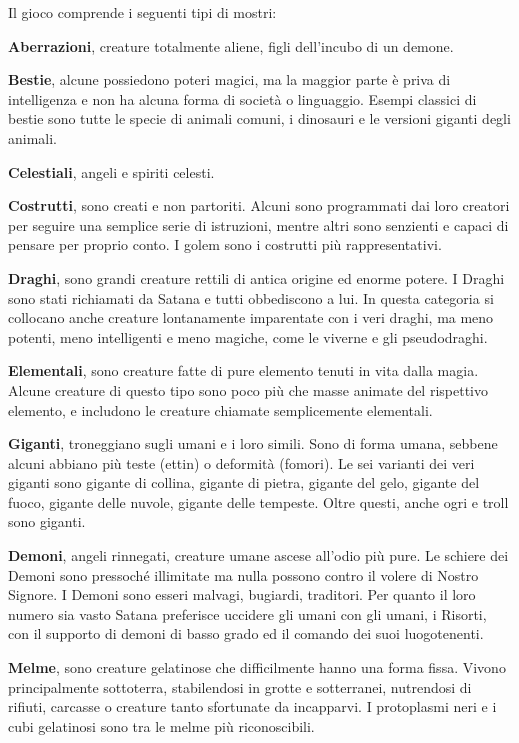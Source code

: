 \documentclass[a4paper,twoside,openany]{book}
\begin{document}
Il gioco comprende i seguenti tipi di mostri:

\smallskip\textbf{Aberrazioni}, creature totalmente aliene, figli dell'incubo di un demone.

\smallskip\textbf{Bestie},  alcune possiedono poteri magici, ma la maggior parte è priva di intelligenza e non ha alcuna forma di società o linguaggio. Esempi classici di bestie sono tutte le specie di animali comuni, i dinosauri e le versioni giganti degli animali.

\smallskip\textbf{Celestiali}, angeli e spiriti celesti.

\smallskip\textbf{Costrutti}, sono creati e non partoriti. Alcuni sono programmati dai loro creatori per seguire una semplice serie di istruzioni, mentre altri sono senzienti e capaci di pensare per proprio conto. I golem sono i costrutti più rappresentativi.

\smallskip\textbf{Draghi}, sono grandi creature rettili di antica origine ed enorme potere. I Draghi sono stati richiamati da Satana e tutti obbediscono a lui. In questa categoria si collocano anche creature lontanamente imparentate con i veri draghi, ma meno potenti, meno intelligenti e meno magiche, come le viverne e gli pseudodraghi.

\smallskip\textbf{Elementali}, sono creature fatte di pure elemento tenuti in vita dalla magia.
Alcune creature di questo tipo sono poco più che masse animate del rispettivo elemento, e includono le creature chiamate semplicemente elementali.

\smallskip\textbf{Giganti}, troneggiano sugli umani e i loro simili. Sono di forma umana, sebbene alcuni abbiano più teste (ettin) o deformità (fomori). Le sei varianti dei veri giganti sono gigante di collina, gigante di pietra, gigante del gelo, gigante del fuoco, gigante delle nuvole, gigante delle tempeste. Oltre questi, anche ogri e troll sono giganti.

\smallskip\textbf{Demoni}, angeli rinnegati, creature umane ascese all'odio più pure. Le schiere dei Demoni sono pressoché illimitate ma nulla possono contro il volere di Nostro Signore. I Demoni sono esseri malvagi, bugiardi, traditori. Per quanto il loro numero sia vasto Satana preferisce uccidere gli umani con gli umani, i Risorti, con il supporto di demoni di basso grado ed il comando dei suoi luogotenenti.

\smallskip\textbf{Melme}, sono creature gelatinose che difficilmente hanno una forma fissa. Vivono principalmente sottoterra, stabilendosi in grotte e sotterranei, nutrendosi di rifiuti, carcasse o creature tanto sfortunate da incapparvi. I protoplasmi neri e i cubi gelatinosi sono tra le melme più riconoscibili.
\end{document}
